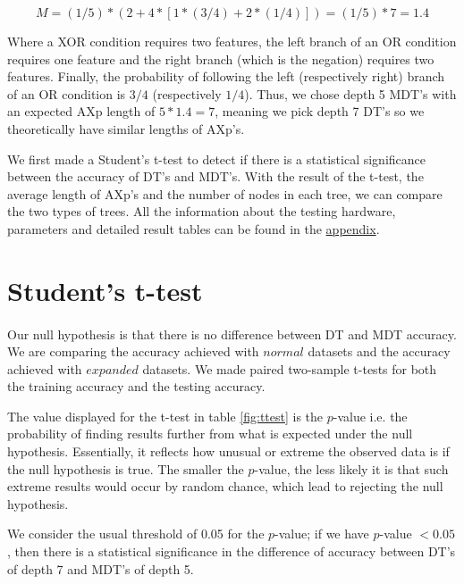 \documentclass[12pt]{report}
\theoremstyle{definition}
\theoremstyle{definition}
\theoremstyle{definition}
\begin{document}
\[ M = (1/5) * ( 2 + 4 * [ 1 * (3/4) + 2 * (1/4)] ) = (1/5) * 7 = 1.4 \]

Where a XOR condition requires two features, the left branch of an OR condition requires one feature and the right branch (which is the negation) requires two features. Finally, the probability of following the left (respectively right) branch of an OR condition is $3/4$ (respectively $1/4$). Thus, we chose depth 5 MDT's with an expected AXp length of $5 * 1.4 = 7$, meaning we pick depth 7 DT's so we theoretically have similar lengths of AXp's.

We first made a Student's t-test to detect if there is a statistical significance between the accuracy of DT's and MDT's. With the result of the t-test, the average length of AXp's and the number of nodes in each tree, we can compare the two types of trees. All the information about the testing hardware, parameters and detailed result tables can be found in the \hyperref[chap:appendix]{appendix}.

\newpage

\section{Student's t-test}
\paragraph{} Our null hypothesis is that there is no difference between DT and MDT accuracy. We are comparing the accuracy achieved with $normal$ datasets and the accuracy achieved with $expanded$ datasets. We made paired two-sample t-tests for both the training accuracy and the testing accuracy. 

The value displayed for the t-test in table \ref{fig:ttest} is the $p$-value i.e. the probability of finding results further from what is expected under the null hypothesis. Essentially, it reflects how unusual or extreme the observed data is if the null hypothesis is true. The smaller the $p$-value, the less likely it is that such extreme results would occur by random chance, which lead to rejecting the null hypothesis. 

We consider the usual threshold of 0.05 for the $p$-value; if we have $p$-value $< 0.05$, then there is a statistical significance in the difference of accuracy between DT's of depth 7 and MDT's of depth 5.
\end{document}
